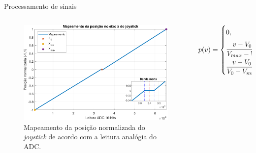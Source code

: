 \documentclass{if-beamer}
\begin{document}
\begin{frame}{Processamento de sinais}
	
	\begin{columns}
		
		\begin{column}{0.5\textwidth}
			
			
			\begin{figure}
				\centering
				\includegraphics[width=1.1\linewidth]{plot_joy_x_axis.pdf}
				\caption{Mapeamento da posição normalizada do \textit{joystick} de acordo com a leitura analógia do ADC.}
				\label{fig:plotjoyxaxis}
			\end{figure}
			
		\end{column}
		
		\begin{column}{0.6\textwidth}
			
			
			\begin{equation}\label{eq:joy}
				p(v) = \begin{dcases}
					0\vphantom{\frac{0}{0}}, &\text{se } - B \le v - V_0 \le B \\
					\frac{v - V_0 - B}{V_{max} - V_0 - B}, &\text{se } v > V_0 + B \\
					\frac{v - V_0 + B}{V_0 - V_{min} - B}, &\text{se } v < V_0 - B 
				\end{dcases}
			\end{equation}
			
		\end{column}
		
	\end{columns}
	
\end{frame}
\end{document}
